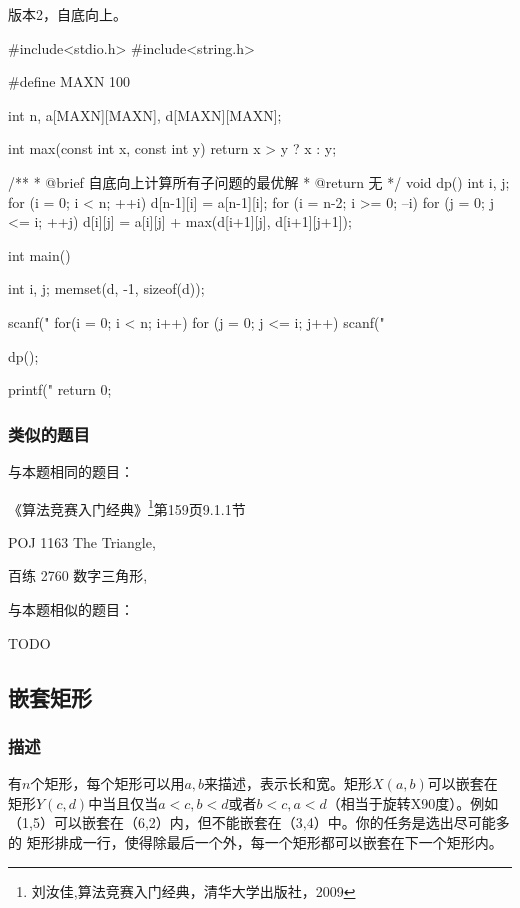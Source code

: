 版本2，自底向上。

\begin{Codex}[label=numbers_triangle2.c]
#include<stdio.h>
#include<string.h>

#define MAXN 100

int n, a[MAXN][MAXN], d[MAXN][MAXN];

int max(const int x, const int y) {
    return x > y ? x : y;
}

/**
 * @brief 自底向上计算所有子问题的最优解
 * @return 无
 */
void dp() {
    int i, j;
    for (i = 0; i < n; ++i) {
        d[n-1][i] = a[n-1][i];
    }
    for (i = n-2; i >= 0; --i)
      for (j = 0; j <= i; ++j)
        d[i][j] = a[i][j] + max(d[i+1][j], d[i+1][j+1]);
}

int main() {
    int i, j;
    memset(d, -1, sizeof(d));

    scanf("%
    for(i = 0; i < n; i++)
      for (j = 0; j <= i; j++) 
          scanf("%

    dp();
    
    printf("%
    return 0;
}
\end{Codex}

\subsubsection{类似的题目}
与本题相同的题目：
\begindot
\item 《算法竞赛入门经典》\footnote{刘汝佳,算法竞赛入门经典，清华大学出版社，2009}第159页9.1.1节
\item POJ 1163 The Triangle, 
\item 百练 2760 数字三角形, 
\myenddot

与本题相似的题目：
\begindot
\item  TODO
\myenddot

\subsection{嵌套矩形}

\subsubsection{描述}
有$n$个矩形，每个矩形可以用$a,b$来描述，表示长和宽。矩形$X(a,b)$可以嵌套在
矩形$Y(c,d)$中当且仅当$a<c,b<d$或者$b<c,a<d$（相当于旋转X90度）。例如
（1,5）可以嵌套在（6,2）内，但不能嵌套在（3,4）中。你的任务是选出尽可能多的
矩形排成一行，使得除最后一个外，每一个矩形都可以嵌套在下一个矩形内。

